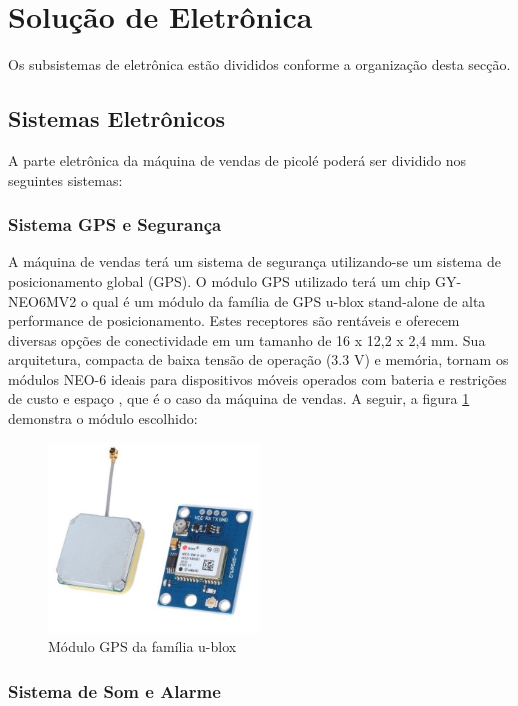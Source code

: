 \section{Solução de Eletrônica}

Os subsistemas de eletrônica estão divididos conforme a organização desta secção. 

\subsection{Sistemas Eletrônicos}

A parte eletrônica da máquina de vendas de picolé poderá ser dividido nos seguintes sistemas:

\subsubsection{Sistema GPS e Segurança}

A máquina de vendas terá um sistema de segurança utilizando-se um sistema de posicionamento global (GPS). O módulo GPS utilizado terá um chip GY-NEO6MV2 o qual é um módulo da família de GPS u-blox stand-alone de alta performance de posicionamento. Estes receptores são rentáveis e oferecem diversas opções de conectividade em um tamanho de 16 x 12,2 x 2,4 mm. Sua arquitetura, compacta de baixa tensão de operação (3.3 V) e memória, tornam os módulos NEO-6 ideais para dispositivos móveis operados com bateria e restrições de custo e espaço \cite{mq1}, que é o caso da máquina de vendas. A seguir, a figura \ref{fig:GPS} demonstra o módulo escolhido:

\begin{figure}[H]
	\centering
    \includegraphics[width=0.5\textwidth]{figuras/modulo_gps}
    \caption{Módulo GPS da família u-blox}
    \label{fig:GPS}
\end{figure}

\subsubsection{Sistema de Som e Alarme}

